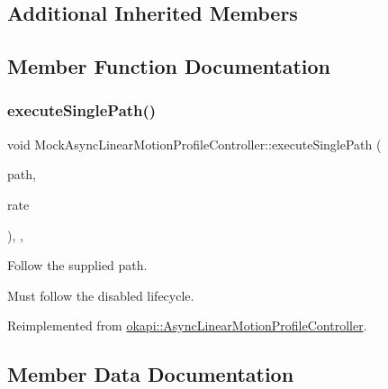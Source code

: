 \subsection*{Additional Inherited Members}


\subsection{Member Function Documentation}
\mbox{\label{classMockAsyncLinearMotionProfileController_abc0b77c50deb4d0dc23c1d2122697689}} 
\subsubsection{\texorpdfstring{executeSinglePath()}{executeSinglePath()}}
{\footnotesize\ttfamily void Mock\+Async\+Linear\+Motion\+Profile\+Controller\+::execute\+Single\+Path (\begin{DoxyParamCaption}\item[{const \mbox{\hyperlink{structokapi_1_1AsyncLinearMotionProfileController_1_1TrajectoryPair}{Trajectory\+Pair}} \&}]{path,  }\item[{std\+::unique\+\_\+ptr$<$ \mbox{\hyperlink{classokapi_1_1AbstractRate}{Abstract\+Rate}} $>$}]{rate }\end{DoxyParamCaption})\hspace{0.3cm}{\ttfamily [inline]}, {\ttfamily [override]}, {\ttfamily [virtual]}}



Follow the supplied path. 

Must follow the disabled lifecycle. 

Reimplemented from \mbox{\hyperlink{classokapi_1_1AsyncLinearMotionProfileController_ac9f7d18503d72627ff4b7f70d2c373bd}{okapi\+::\+Async\+Linear\+Motion\+Profile\+Controller}}.



\subsection{Member Data Documentation}
\mbox{\label{classMockAsyncLinearMotionProfileController_ad7b56b1f436e8ca244cb12d75f6b13b4}} 
